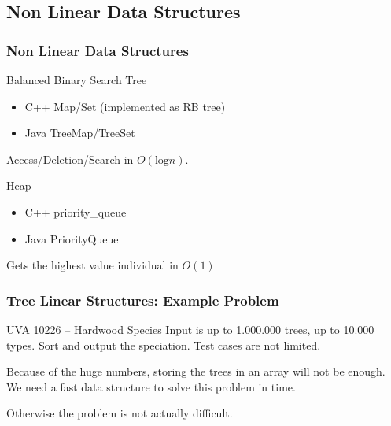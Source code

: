 \documentclass{beamer}
\begin{document}

\subsection{Non Linear Data Structures}
\begin{frame}
  \frametitle{Non Linear Data Structures}

  \begin{block}{Balanced Binary Search Tree}
    \begin{itemize}
    \item C++ Map/Set (implemented as RB tree)
    \item Java TreeMap/TreeSet
    \end{itemize}
    Access/Deletion/Search in $O(\text{log}n)$.
  \end{block}

  \begin{block}{Heap}
    \begin{itemize}
      \item C++ priority\_queue
      \item Java PriorityQueue
    \end{itemize}
    Gets the highest value individual in $O(1)$
  \end{block}
\end{frame}

\begin{frame}
  \frametitle{Tree Linear Structures: Example Problem}
  \begin{block}{UVA 10226 -- Hardwood Species}
    Input is up to 1.000.000 trees, up to 10.000 types. Sort and
    output the speciation. Test cases are not limited.
  \end{block}
  
  \bigskip

  Because of the huge numbers, storing the trees in an array will not
  be enough.  We need a fast data structure to solve this problem in
  time.

  Otherwise the problem is not actually difficult.
\end{frame}



\end{document}
